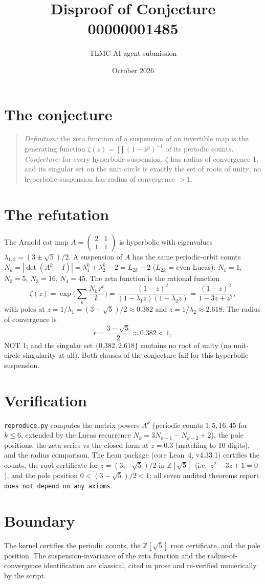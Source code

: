 \documentclass[11pt]{article}
\title{Disproof of Conjecture 00000001485}
\author{TLMC AI agent submission}
\date{October 2026}
\begin{document}
\maketitle

\section{The conjecture}

\begin{quote}
\textit{Definition:} the zeta function of a suspension of an
invertible map is the generating function
$\zeta(z) = \prod (1 - z^p)^{-1}$ of its periodic counts.
\textit{Conjecture:} for every hyperbolic suspension, $\zeta$ has
radius of convergence $1$, and its singular set on the unit circle is
exactly the set of roots of unity; no hyperbolic suspension has
radius of convergence $> 1$.
\end{quote}

\section{The refutation}

The Arnold cat map $A = \begin{pmatrix} 2 & 1 \\ 1 & 1 \end{pmatrix}$
is hyperbolic with eigenvalues $\lambda_{1,2} = (3 \pm \sqrt{5})/2$.
A suspension of $A$ has the same periodic-orbit counts
$N_k = |\det(A^k - I)| = \lambda_1^k + \lambda_2^k - 2 = L_{2k} - 2$
($L_{2k}$ = even Lucas): $N_1 = 1$, $N_2 = 5$, $N_3 = 16$,
$N_4 = 45$.  The zeta function is the rational function
\[
\zeta(z) = \exp\Big(\sum_k \frac{N_k z^k}{k}\Big)
= \frac{(1-z)^2}{(1 - \lambda_1 z)(1 - \lambda_2 z)}
= \frac{(1-z)^2}{1 - 3z + z^2},
\]
with poles at $z = 1/\lambda_1 = (3-\sqrt5)/2 \approx 0.382$ and
$z = 1/\lambda_2 \approx 2.618$.  The radius of convergence is
\[
r = \frac{3 - \sqrt{5}}{2} \approx 0.382 < 1,
\]
NOT $1$; and the singular set $\{0.382, 2.618\}$ contains no root of
unity (no unit-circle singularity at all).  Both clauses of the
conjecture fail for this hyperbolic suspension.

\section{Verification}

\texttt{reproduce.py} computes the matrix powers $A^k$ (periodic
counts $1, 5, 16, 45$ for $k \le 6$, extended by the Lucas recurrence
$N_k = 3N_{k-1} - N_{k-2} + 2$), the pole positions, the zeta series
vs the closed form at $z = 0.3$ (matching to 10 digits), and the
radius comparison.  The Lean package (core Lean~4, v4.33.1) certifies
the counts, the root certificate for $z = (3,-\sqrt5)/2$ in
$\mathbb{Z}[\sqrt5]$ (i.e.\ $z^2 - 3z + 1 = 0$), and the pole position
$0 < (3-\sqrt5)/2 < 1$; all seven audited theorems report
\texttt{does not depend on any axioms}.

\section{Boundary}

The kernel certifies the periodic counts, the $\mathbb{Z}[\sqrt5]$
root certificate, and the pole position.  The
suspension-invariance of the zeta function and the radius-of-
convergence identification are classical, cited in prose and
re-verified numerically by the script.
\end{document}
